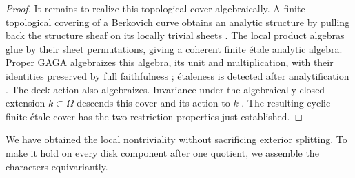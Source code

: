\begin{proof}
It remains to realize this topological cover algebraically. A finite
topological covering of a Berkovich curve obtains an analytic structure
by pulling back the structure sheaf on its locally trivial sheets
\cite[Lemma~2.6]{DeJongCoverings}. The local product
algebras glue by their sheet permutations, giving a coherent finite
\'etale analytic algebra. Proper GAGA algebraizes this algebra,
its unit and multiplication, with their identities preserved by
full faithfulness \cite[Appendix~A, Theorem~A.1(ii)]{GAGA};
\'etaleness is detected after analytification
\cite[Fact~5.1.5]{TemkinAnalytic}. The deck action also algebraizes.
Invariance under the algebraically closed extension $\bar k\subset\Omega$
descends this cover and its action to $\bar k$
\cite[Expos\'e~X, Corollary~1.8]{SGA1}. The resulting cyclic finite
\'etale cover has the two restriction properties just established.
\end{proof}

We have obtained the local nontriviality without sacrificing exterior
splitting. To make it hold on every disk component after one quotient,
we assemble the characters equivariantly.
